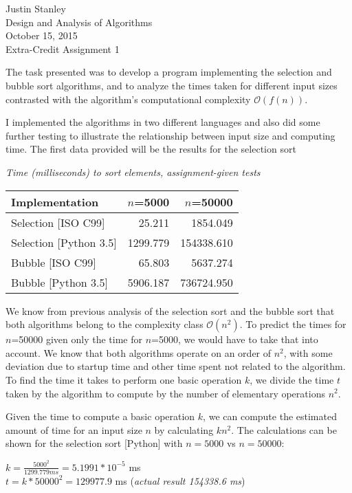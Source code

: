 \documentclass{article}
\begin{document}
\noindent Justin Stanley \\
Design and Analysis of Algorithms \\
October 15, 2015 \\
Extra-Credit Assignment 1 \\

\hrulefill

The task presented was to develop a program implementing the selection and bubble sort algorithms,
and to analyze the times taken for different input sizes contrasted with the algorithm's computational complexity $\mathcal{O}(f(n))$.

I implemented the algorithms in two different languages and also did some further testing to illustrate the relationship between input size and computing time.
The first data provided will be the results for the selection sort

\begin{center}
	\textit{Time (milliseconds) to sort elements, assignment-given tests}
	\begin{tabular}{l | r | r}
		Implementation & $n$=5000 & $n$=50000 \\ \hline
		Selection [ISO C99] & 25.211 & 1854.049 \\ \hline
		Selection [Python 3.5] & 1299.779 & 154338.610 \\ \hline
		Bubble [ISO C99] & 65.803 & 5637.274 \\ \hline
		Bubble [Python 3.5] & 5906.187 & 736724.950 \\
	\end{tabular}
\end{center}

We know from previous analysis of the selection sort and the bubble sort that both algorithms belong to the complexity class $\mathcal{O}(n^2)$. To predict the times for $n$=50000 given only the time for $n$=5000, we would have to take that into account. We know that both algorithms operate on an order of $n^2$, with some deviation due to startup time and other time spent not related to the algorithm. To find the time it takes to perform one basic operation $k$, we divide the time $t$ taken by the algorithm to compute by the number of elementary operations $n^2$.

Given the time to compute a basic operation $k$, we can compute the estimated amount of time for an input size $n$ by calculating $kn^2$. The calculations can be shown for the selection sort [Python] with $n=5000$ vs $n=50000$:

\begin{center}
	$k = \frac{5000^2}{1299.779 ms} = 5.1991 * 10^{- 5}$ ms \\
	$t = k*50000^2 = 129977.9$ ms (\textit{actual result 154338.6 ms})
\end{center}
\end{document}
